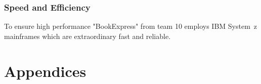 \documentclass[11pt,a4paper,oneside,svgnames]{report}
\begin{document}
\subsection{Speed and Efficiency}
To ensure high performance "BookExpress" from team 10 employs IBM System~z mainframes which are extraordinary fast and reliable.



\chapter{Appendices}
\printglossaries{}

\listoffigures{}
\listoftables{}
\end{document}
